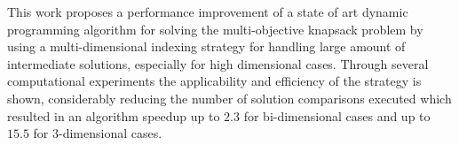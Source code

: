 This work proposes a performance improvement
of a state of art dynamic programming algorithm for
solving the multi-objective knapsack problem by using
a multi-dimensional indexing strategy
for handling large amount of intermediate solutions,
especially for high dimensional cases.
Through several computational experiments
the applicability and efficiency of the strategy is shown,
considerably reducing the number of solution comparisons 
executed which resulted in an algorithm speedup up to $2.3$
for bi-dimensional cases and up to
$15.5$ for 3-dimensional cases.

